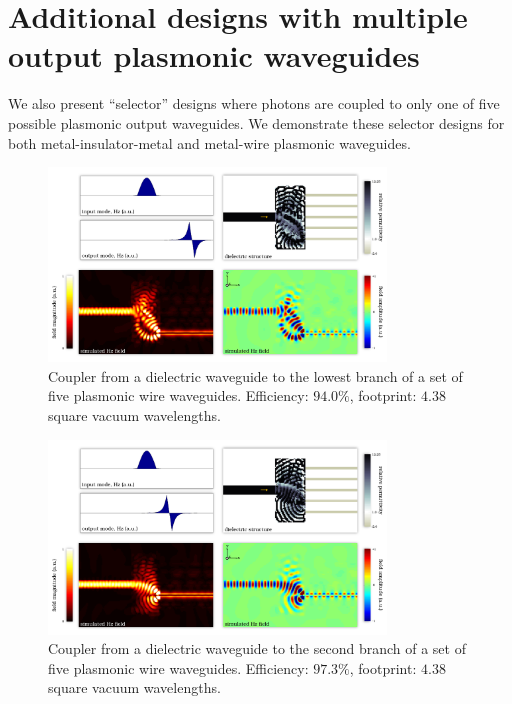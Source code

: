 \section{Additional designs with multiple output plasmonic waveguides}
We also present ``selector'' designs where photons are coupled to 
    only one of five possible plasmonic output waveguides.
We demonstrate these selector designs for both metal-insulator-metal and
    metal-wire plasmonic waveguides.
\begin{figure}[h!]
    \centering
    \includegraphics[width=0.8\textwidth]{p3/16}
    \caption{
        Coupler from a dielectric waveguide to the 
            lowest branch of a set of five plasmonic wire waveguides.
        Efficiency: $94.0\%$,
        footprint: $4.38$ square vacuum wavelengths.
        }
\end{figure}
\begin{figure}[h!]
    \centering
    \includegraphics[width=0.8\textwidth]{p3/17}
    \caption{
        Coupler from a dielectric waveguide to the 
            second branch of a set of five plasmonic wire waveguides.
        Efficiency: $97.3\%$,
        footprint: $4.38$ square vacuum wavelengths.
        }
\end{figure}
